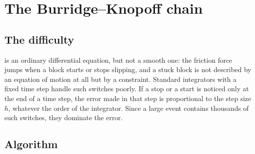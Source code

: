 \section{The Burridge--Knopoff chain}
\label{sec:num-bk}

\subsection{The difficulty}

 is an ordinary differential equation, but not a smooth one: the friction force jumps when a block starts or stops slipping,
and a stuck block is not described by an equation of motion at all but by a constraint. Standard integrators with a fixed time step handle
such switches poorly. If a stop or a start is noticed only at the end of a time step, the error made in that step is proportional to the
step size $h$, whatever the order of the integrator. Since a large event contains thousands of such switches, they dominate the error.

\subsection{Algorithm}

